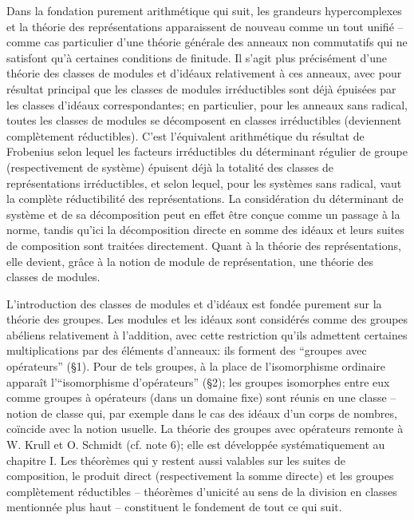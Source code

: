 Dans la fondation purement arithmétique qui suit, les grandeurs hypercomplexes et la théorie des représentations apparaissent de nouveau comme un tout unifié -- comme cas particulier d'une théorie générale des anneaux non commutatifs qui ne satisfont qu'à certaines conditions de finitude. Il s'agit plus précisément d'une théorie des classes de modules et d'idéaux relativement à ces anneaux, avec pour résultat principal que les classes de modules irréductibles sont déjà épuisées par les classes d'idéaux correspondantes; en particulier, pour les anneaux sans radical, toutes les classes de modules se décomposent en classes irréductibles (deviennent complètement réductibles). C'est l'équivalent arithmétique du résultat de Frobenius selon lequel les facteurs irréductibles du déterminant régulier de groupe (respectivement de système) épuisent déjà la totalité des classes de représentations irréductibles, et selon lequel, pour les systèmes sans radical, vaut la complète réductibilité des représentations. La considération du déterminant de système et de sa décomposition peut en effet être conçue comme un passage à la norme, tandis qu'ici la décomposition directe en somme des idéaux et leurs suites de composition sont traitées directement. Quant à la théorie des représentations, elle devient, grâce à la notion de module de représentation, une théorie des classes de modules.

L'introduction des classes de modules et d'idéaux est fondée purement sur la théorie des groupes. Les modules et les idéaux sont considérés comme des groupes abéliens relativement à l'addition, avec cette restriction qu'ils admettent certaines multiplications par des éléments d'anneaux: ils forment des ``groupes avec opérateurs'' (\S{}1). Pour de tels groupes, à la place de l'isomorphisme ordinaire apparaît l'``isomorphisme d'opérateurs'' (\S{}2); les groupes isomorphes entre eux comme groupes à opérateurs (dans un domaine fixe) sont réunis en une classe -- notion de classe qui, par exemple dans le cas des idéaux d'un corps de nombres, coïncide avec la notion usuelle. La théorie des groupes avec opérateurs remonte à W. Krull et O. Schmidt (cf. note 6); elle est développée systématiquement au chapitre I. Les théorèmes qui y restent aussi valables sur les suites de composition, le produit direct (respectivement la somme directe) et les groupes complètement réductibles -- théorèmes d'unicité au sens de la division en classes mentionnée plus haut -- constituent le fondement de tout ce qui suit.

